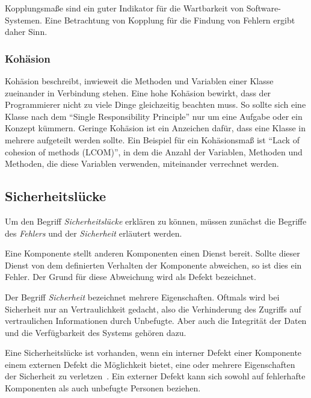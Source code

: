 Kopplungsmaße sind ein guter Indikator für die Wartbarkeit von Software-Systemen.
Eine Betrachtung von Kopplung für die Findung von Fehlern ergibt daher Sinn.

\subsubsection{Kohäsion}
Kohäsion beschreibt, inwieweit die Methoden und Variablen einer Klasse zueinander in Verbindung stehen.
Eine hohe Kohäsion bewirkt, dass der Programmierer nicht zu viele Dinge gleichzeitig beachten muss.
So sollte sich eine Klasse nach dem "`Single Responsibility Principle"' nur um eine Aufgabe oder ein Konzept kümmern.
Geringe Kohäsion ist ein Anzeichen dafür, dass eine Klasse in mehrere aufgeteilt werden sollte.
Ein Beispiel für ein Kohäsionsmaß ist "`Lack of cohesion of methods (LCOM)"', in dem die Anzahl der Variablen, Methoden und Methoden, die diese Variablen verwenden, miteinander verrechnet werden.

\subsection{Sicherheitslücke}
Um den Begriff \emph{Sicherheitslücke} erklären zu können, müssen zunächst die Begriffe des \emph{Fehlers} und der \emph{Sicherheit} erläutert werden.

Eine Komponente stellt anderen Komponenten einen Dienst bereit.
Sollte dieser Dienst von dem definierten Verhalten der Komponente abweichen, so ist dies ein Fehler.
Der Grund für diese Abweichung wird als Defekt bezeichnet.

Der Begriff \emph{Sicherheit} bezeichnet mehrere Eigenschaften.
Oftmals wird bei Sicherheit nur an Vertraulichkeit gedacht, also die Verhinderung des Zugriffs auf vertraulichen Informationen durch Unbefugte.
Aber auch die Integrität der Daten und die Verfügbarkeit des Systems gehören dazu.

Eine Sicherheitslücke ist vorhanden, wenn ein interner Defekt einer Komponente einem externen Defekt die Möglichkeit bietet, eine oder mehrere Eigenschaften der Sicherheit zu verletzen~\cite{basics}.
Ein externer Defekt kann sich sowohl auf fehlerhafte Komponenten als auch unbefugte Personen beziehen.


